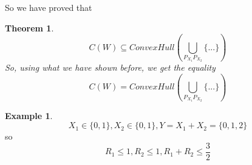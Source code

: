 \documentclass[twoside]{article}
\newtheorem{theorem}{Theorem}[section]
\theoremstyle{definition} %
\newtheorem{example}{Example}
\begin{document}
So we have proved that

\begin{theorem}
  \[
    C(W) \subseteq ConvexHull(\bigcup_{P_{X_1} P_{X_2}} \{...\})
  \]
  So, using what we have shown before, we get the equality
  \[
    C(W) = ConvexHull(\bigcup_{P_{X_1} P_{X_2}} \{...\})
  \]
\end{theorem}

\begin{example}
  \[
    X_1 \in \{0, 1\}, X_2 \in \{0, 1\}, Y = X_1 + X_2 = \{0, 1, 2\}
  \]
  so
  \[
    R_1 \leq 1, R_2 \leq 1, R_1 + R_2 \leq \frac{3}{2}
  \]
\end{example}







\end{document}
